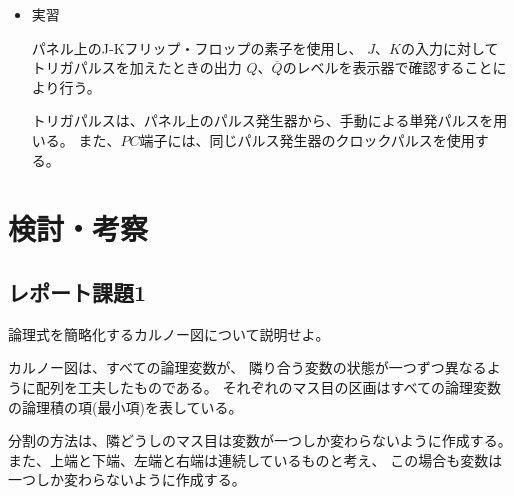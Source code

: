 \documentclass[12pt]{jarticle}
\begin{document}
\begin{itemize}
          \clearpage

    \item 実習

          パネル上のJ-Kフリップ・フロップの素子を使用し、
          $J$、$K$の入力に対してトリガパルスを加えたときの出力
          $Q$、$\overline{Q}$のレベルを表示器で確認することにより行う。

          トリガパルスは、パネル上のパルス発生器から、手動による単発パルスを用いる。
          また、$PC$端子には、同じパルス発生器のクロックパルスを使用する。
\end{itemize}

\section{検討・考察}

\subsection{レポート課題1}
\begin{shadebox}
    論理式を簡略化するカルノー図について説明せよ。
\end{shadebox}
カルノー図は、すべての論理変数が、
隣り合う変数の状態が一つずつ異なるように配列を工夫したものである。
それぞれのマス目の区画はすべての論理変数の論理積の項(最小項)を表している。

分割の方法は、隣どうしのマス目は変数が一つしか変わらないように作成する。
また、上端と下端、左端と右端は連続しているものと考え、
この場合も変数は一つしか変わらないように作成する。
\end{document}
